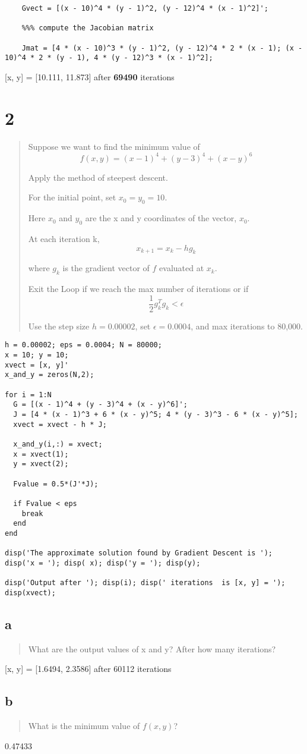 \documentclass[11pt]{article}
\begin{document}
\begin{verbatim}
    Gvect = [(x - 10)^4 * (y - 1)^2, (y - 12)^4 * (x - 1)^2]';

    %%% compute the Jacobian matrix

    Jmat = [4 * (x - 10)^3 * (y - 1)^2, (y - 12)^4 * 2 * (x - 1); (x - 10)^4 * 2 * (y - 1), 4 * (y - 12)^3 * (x - 1)^2];
\end{verbatim}

[x, y] = [10.111, 11.873] after \textbf{69490} iterations

\section{2}
\label{sec:orge88fe69}

\begin{quote}
Suppose we want to find the minimum value of $$f(x,y) = (x - 1)^4 + (y - 3)^4 +
(x - y)^6$$

Apply the method of steepest descent.

For the initial point, set \(x_0 = y_0 = 10\).

Here \(x_0\) and \(y_0\) are the x and y coordinates of the vector, \(x_0\).

At each iteration k, $$x_{k+1} = x_k - h g_k$$

where \(g_k\) is the gradient vector of \(f\) evaluated at \(x_k\).

Exit the Loop if we reach the max number of iterations or if $$\frac{1}{2}
g_k^T g_k < \epsilon$$

Use the step size \(h = 0.00002\), set \(\epsilon = 0.0004\), and max iterations to 80,000.
\end{quote}


\begin{verbatim}
h = 0.00002; eps = 0.0004; N = 80000;
x = 10; y = 10;
xvect = [x, y]'
x_and_y = zeros(N,2);

for i = 1:N
  G = [(x - 1)^4 + (y - 3)^4 + (x - y)^6]';
  J = [4 * (x - 1)^3 + 6 * (x - y)^5; 4 * (y - 3)^3 - 6 * (x - y)^5];
  xvect = xvect - h * J;

  x_and_y(i,:) = xvect;
  x = xvect(1);
  y = xvect(2);
 
  Fvalue = 0.5*(J'*J);

  if Fvalue < eps
    break
  end
end

disp('The approximate solution found by Gradient Descent is ');
disp('x = '); disp( x); disp('y = '); disp(y);

disp('Output after '); disp(i); disp(' iterations  is [x, y] = ');
disp(xvect);
\end{verbatim}

\subsection{a}
\label{sec:org21f66ee}

\begin{quote}
What are the output values of x and y? After how many iterations?
\end{quote}

[x, y] = [1.6494, 2.3586] after 60112 iterations
\subsection{b}
\label{sec:org9d307e0}

\begin{quote}
What is the minimum value of \(f(x,y)\)?
\end{quote}

0.47433
\end{document}
